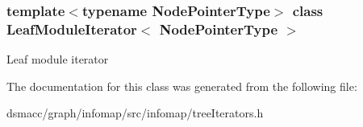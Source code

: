 \subsubsection*{template$<$typename Node\+Pointer\+Type$>$\newline
class Leaf\+Module\+Iterator$<$ Node\+Pointer\+Type $>$}

Leaf module iterator 

The documentation for this class was generated from the following file\+:\begin{DoxyCompactItemize}
\item 
dsmacc/graph/infomap/src/infomap/tree\+Iterators.\+h\end{DoxyCompactItemize}
